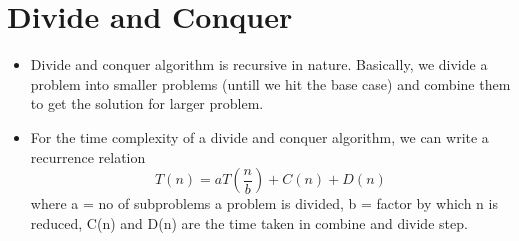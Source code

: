 \documentclass{article}
\begin{document}
\section{Divide and Conquer}
\begin{itemize}
	\item Divide and conquer algorithm is recursive in nature. Basically, we divide a problem into smaller problems (untill we hit the base case) and combine them to get the solution for larger problem.
	\item  For the time complexity of a divide and conquer algorithm, we can write a recurrence relation
	\begin{equation*}
		T(n) = aT(\frac{n}{b}) + C(n) + D(n)		
	\end{equation*}
	where a = no of subproblems a problem is divided, b = factor by which n is reduced, C(n) and D(n) are the time taken in combine and divide step.
\end{itemize}
\end{document}
